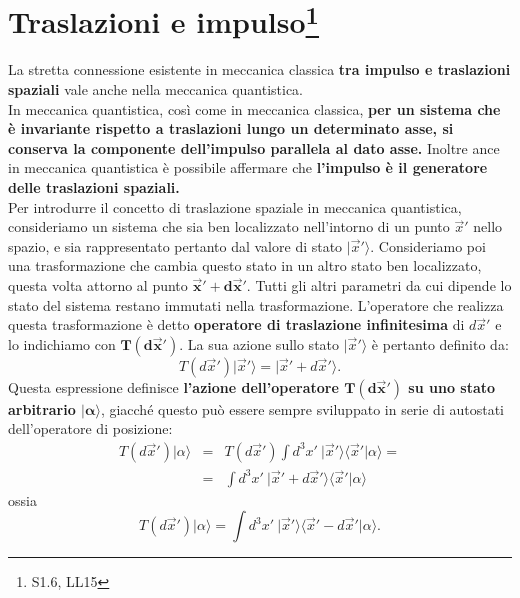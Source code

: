 \chapter[Traslazioni e impulso]{Traslazioni e impulso\footnote{S1.6, LL15}}
La stretta connessione esistente in meccanica classica \textbf{tra impulso e traslazioni spaziali} vale anche nella meccanica quantistica.\\
In meccanica quantistica, così come in meccanica classica, \textbf{per un sistema che è invariante rispetto a traslazioni lungo un determinato asse, si conserva la componente dell'impulso parallela al dato asse.} Inoltre ance in meccanica quantistica è possibile affermare che \textbf{l'impulso è il generatore delle traslazioni spaziali.}\\
Per introdurre il concetto di traslazione spaziale in meccanica quantistica, consideriamo un sistema che sia ben localizzato nell'intorno di un punto $\vec{x}'$ nello spazio, e sia rappresentato pertanto dal valore di stato $\vert \vec{x}' \rangle$. Consideriamo poi una trasformazione che cambia questo stato in un altro stato ben localizzato, questa volta attorno al punto $\mathbf{\vec{x}'+ d\vec{x}'}$. Tutti gli altri parametri da cui dipende lo stato del sistema restano immutati nella trasformazione. L'operatore che realizza questa trasformazione è detto \textbf{operatore di traslazione infinitesima} di $d\vec{x}'$ e lo indichiamo con $\mathbf{T(d\vec{x}')}$. La sua azione sullo stato
 $\vert \vec{x}' \rangle$ è pertanto definito da:
\begin{equation}
T(d\vec{x}')\vert \vec{x}' \rangle=\vert \vec{x}'+ d\vec{x}' \rangle .
\end{equation}
Questa espressione definisce \textbf{l'azione dell'operatore $\mathbf{T(d\vec{x}')}$ su uno stato arbitrario $\mathbf{\vert \alpha \rangle}$}, giacché questo può essere sempre sviluppato in serie di autostati dell'operatore di posizione:
\begin{eqnarray}
T(d\vec{x}') \vert \alpha \rangle & = & T(d\vec{x}') \int d^3x' \ \vert \vec{x}' \rangle \langle \vec{x}' \vert \alpha \rangle =  \nonumber \\
& = & \int d^3x' \ \vert \vec{x}' + d \vec{x}' \rangle \langle \vec{x}' \vert \alpha \rangle 
\end{eqnarray}
ossia
\begin{equation}
T(d\vec{x}') \vert \alpha \rangle  = \int d^3x' \ \vert \vec{x}'  \rangle \langle \vec{x}' - d \vec{x}' \vert \alpha \rangle .
\end{equation}
